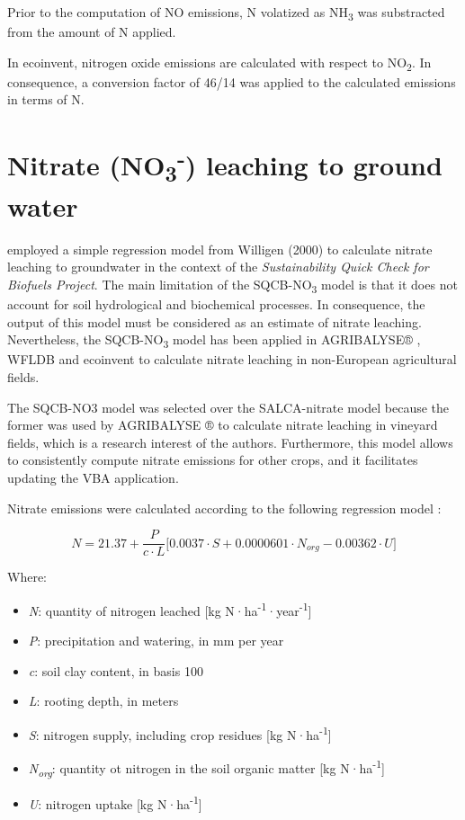\documentclass[openany]{book}
\begin{document}
Prior to the computation of NO emissions, N volatized as NH\textsubscript{3} was substracted from the amount of N applied.

In ecoinvent, nitrogen oxide emissions are calculated with respect to NO\textsubscript{2}. In consequence, a conversion factor of 46/14 was applied to the calculated emissions in terms of N.

\hypertarget{nitrate-no3--leaching-to-ground-water}{%
\section{\texorpdfstring{Nitrate (NO\textsubscript{3}\textsuperscript{-}) leaching to ground water}{Nitrate (NO3-) leaching to ground water}}\label{nitrate-no3--leaching-to-ground-water}}

\citet{faist2009} employed a simple regression model from Willigen (2000) to calculate nitrate leaching to groundwater in the context of the \emph{Sustainability Quick Check for Biofuels Project}. The main limitation of the SQCB-NO\textsubscript{3} model is that it does not account for soil hydrological and biochemical processes. In consequence, the output of this model must be considered as an estimate of nitrate leaching. Nevertheless, the SQCB-NO\textsubscript{3} model has been applied in AGRIBALYSE® \citep{Koch2015}, WFLDB \citep{nemecek2014} and ecoinvent \citep{nemecek2011} to calculate nitrate leaching in non-European agricultural fields.

The SQCB-NO3 model was selected over the SALCA-nitrate model because the former was used by AGRIBALYSE ® to calculate nitrate leaching in vineyard fields, which is a research interest of the authors. Furthermore, this model allows to consistently compute nitrate emissions for other crops, and it facilitates updating the VBA application.

Nitrate emissions were calculated according to the following regression model \citep{faist2009}:

\[N=21.37 + \frac{P}{c \cdot L} \Big[0.0037 \cdot S + 0.0000601 \cdot N_{org} - 0.00362 \cdot U  \Big]\]

Where:

\begin{itemize}
\item
  \emph{N}: quantity of nitrogen leached {[}kg N·ha\textsuperscript{-1}·year\textsuperscript{-1}{]}
\item
  \emph{P}: precipitation and watering, in mm per year
\item
  \emph{c}: soil clay content, in basis 100
\item
  \emph{L}: rooting depth, in meters
\item
  \emph{S}: nitrogen supply, including crop residues {[}kg N·ha\textsuperscript{-1}{]}
\item
  \emph{N\textsubscript{org}}: quantity ot nitrogen in the soil organic matter {[}kg N·ha\textsuperscript{-1}{]}
\item
  \emph{U}: nitrogen uptake {[}kg N·ha\textsuperscript{-1}{]}
\end{itemize}
\end{document}

